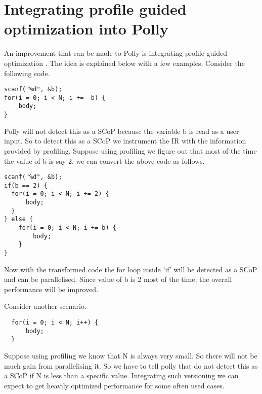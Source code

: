 \section{Integrating profile guided optimization into Polly}
An improvement that can be made to Polly is integrating profile guided optimization
\cite{pgo}. The idea is explained below with a few examples. Consider the following code.
{\footnotesize
\begin{lstlisting}
scanf("%d", &b);
for(i = 0; i < N; i +=  b) {
    body;
}
\end{lstlisting}
}
Polly will not detect this as a SCoP because the variable b is read as a user
input. So to detect this as a SCoP we instrument the IR with the information
provided by profiling. Suppose using profiling we figure out that most of the 
time the value of b is say 2. we can convert the above code as follows.
{\footnotesize
\begin{lstlisting}
scanf("%d", &b);
if(b == 2) {
  for(i = 0; i < N; i += 2) {
      body;
  }
} else {
    for(i = 0; i < N; i += b) {
        body;
    }
}
\end{lstlisting}
}
Now with the transformed code the for loop inside 'if' will be detected as a 
SCoP and can be parallelised. Since value of b is 2 most of the time, the 
overall performance will be improved.

\noindent
Consider another scenario.
{\footnotesize
\begin{lstlisting}
  for(i = 0; i < N; i++) {
      body;
  }
\end{lstlisting}
}
Suppose using profiling we know that N is always very small. So there will not be
much gain from parallelising it. So we have to tell polly that do not detect
this as a SCoP if N is less than a specific value.
Integrating such versioning we can expect to get heavily optimized performance 
for some often used cases.


